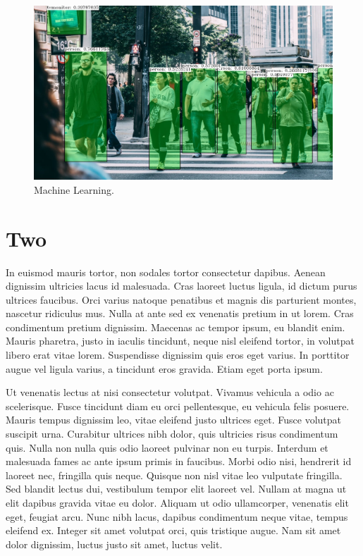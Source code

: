 \begin{spacing}{2.0}
\begin{figure}[ht]
\centering
\includegraphics[width=5in, fbox]{Figures/opencv.png}
\caption{Machine Learning.}
\label{fig:opencvexample} 
\end{figure}

\section{Two}
In euismod mauris tortor, non sodales tortor consectetur dapibus. Aenean dignissim ultricies lacus id malesuada. Cras laoreet luctus ligula, id dictum purus ultrices faucibus. Orci varius natoque penatibus et magnis dis parturient montes, nascetur ridiculus mus. Nulla at ante sed ex venenatis pretium in ut lorem. Cras condimentum pretium dignissim. Maecenas ac tempor ipsum, eu blandit enim. Mauris pharetra, justo in iaculis tincidunt, neque nisl eleifend tortor, in volutpat libero erat vitae lorem. Suspendisse dignissim quis eros eget varius. In porttitor augue vel ligula varius, a tincidunt eros gravida. Etiam eget porta ipsum.

Ut venenatis lectus at nisi consectetur volutpat. Vivamus vehicula a odio ac scelerisque. Fusce tincidunt diam eu orci pellentesque, eu vehicula felis posuere. Mauris tempus dignissim leo, vitae eleifend justo ultrices eget. Fusce volutpat suscipit urna. Curabitur ultrices nibh dolor, quis ultricies risus condimentum quis. Nulla non nulla quis odio laoreet pulvinar non eu turpis. Interdum et malesuada fames ac ante ipsum primis in faucibus. Morbi odio nisi, hendrerit id laoreet nec, fringilla quis neque. Quisque non nisl vitae leo vulputate fringilla. Sed blandit lectus dui, vestibulum tempor elit laoreet vel. Nullam at magna ut elit dapibus gravida vitae eu dolor. Aliquam ut odio ullamcorper, venenatis elit eget, feugiat arcu. Nunc nibh lacus, dapibus condimentum neque vitae, tempus eleifend ex. Integer sit amet volutpat orci, quis tristique augue. Nam sit amet dolor dignissim, luctus justo sit amet, luctus velit.


\end{spacing}
